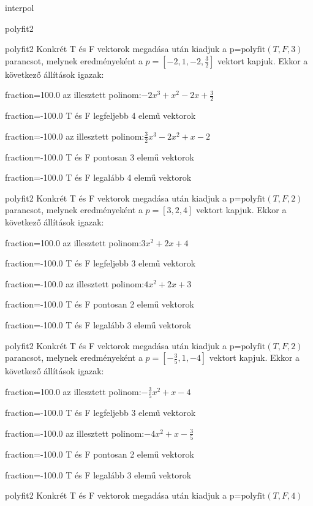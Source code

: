 \documentclass[12pt]{article}
\begin{document}
\begin{quiz}{interpol}
\begin{multi}[multiple]{polyfit2}
\end{multi}
\begin{multi}[multiple]{polyfit2}
Konkrét T és F vektorok megadása után kiadjuk a p=$\mathrm{polyfit}(T,F,3)$
parancsot, melynek eredményeként a $p=\left[-2,1,-2,\frac{3}{2}\right]$ vektort kapjuk.
Ekkor a következő állítások igazak:
\item[fraction=100.0] az illesztett polinom:$-2x^3+x^2-2x+\frac{3}{2}$
\item[fraction=-100.0]  T és F legfeljebb 4 elemű vektorok
\item[fraction=-100.0]  az illesztett polinom:$\frac{3}{2}x^3-2x^2+x-2$
\item[fraction=-100.0]  T és F pontosan 3 elemű vektorok
\item[fraction=-100.0] T és F legalább 4 elemű vektorok
\end{multi}
\begin{multi}[multiple]{polyfit2}
Konkrét T és F vektorok megadása után kiadjuk a p=$\mathrm{polyfit}(T,F,2)$
parancsot, melynek eredményeként a $p=\left[3,2,4\right]$ vektort kapjuk.
Ekkor a következő állítások igazak:
\item[fraction=100.0] az illesztett polinom:$3x^2+2x+4$
\item[fraction=-100.0]  T és F legfeljebb 3 elemű vektorok
\item[fraction=-100.0]  az illesztett polinom:$4x^2+2x+3$
\item[fraction=-100.0]  T és F pontosan 2 elemű vektorok
\item[fraction=-100.0] T és F legalább 3 elemű vektorok
\end{multi}
\begin{multi}[multiple]{polyfit2}
Konkrét T és F vektorok megadása után kiadjuk a p=$\mathrm{polyfit}(T,F,2)$
parancsot, melynek eredményeként a $p=\left[-\frac{3}{5},1,-4\right]$ vektort kapjuk.
Ekkor a következő állítások igazak:
\item[fraction=100.0] az illesztett polinom:$-\frac{3}{5}x^2+x-4$
\item[fraction=-100.0]  T és F legfeljebb 3 elemű vektorok
\item[fraction=-100.0]  az illesztett polinom:$-4x^2+x-\frac{3}{5}$
\item[fraction=-100.0]  T és F pontosan 2 elemű vektorok
\item[fraction=-100.0] T és F legalább 3 elemű vektorok
\end{multi}
\begin{multi}[multiple]{polyfit2}
Konkrét T és F vektorok megadása után kiadjuk a p=$\mathrm{polyfit}(T,F,4)$

\end{multi}
\end{quiz}
\end{document}
